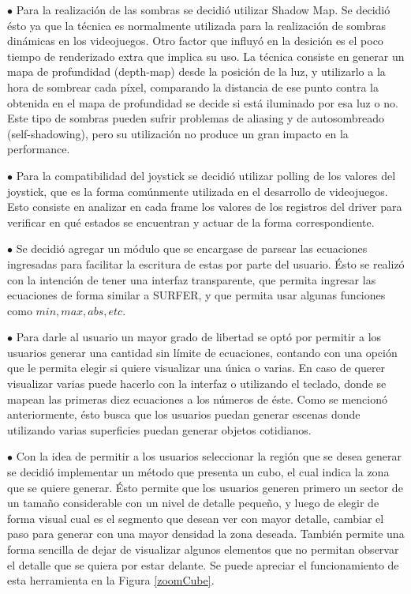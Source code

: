 \documentclass[12pt]{article}
\begin{document}
$\bullet$ Para la realización de las sombras se decidió utilizar Shadow Map\cite{shadowmap}\cite{realtimerendering}. Se decidió ésto ya que la técnica es normalmente utilizada para la realización de sombras dinámicas en los videojuegos\cite{engine}\cite{realtimerendering}. Otro factor que influyó en la desición es el poco tiempo de renderizado extra que implica su uso. La técnica consiste en generar un mapa de profundidad (depth-map) desde la posición de la luz, y utilizarlo a la hora de sombrear cada píxel, comparando la distancia de ese punto contra la obtenida en el mapa de profundidad se decide si está iluminado por esa luz o no. Este tipo de sombras pueden sufrir problemas de aliasing y de autosombreado (self-shadowing)\cite{realtimerendering}, pero su utilización no produce un gran impacto en la performance.

$\bullet$ Para la compatibilidad del joystick se decidió utilizar polling de los valores del joystick, que es la forma comúnmente utilizada en el desarrollo de videojuegos\cite{engine}. Esto consiste en analizar en cada frame los valores de los registros del driver para verificar en qué estados se encuentran y actuar de la forma correspondiente.

$\bullet$ Se decidió agregar un módulo que se encargase de parsear las ecuaciones ingresadas para facilitar la escritura de estas por parte del usuario. Ésto se realizó con la intención de tener una interfaz transparente, que permita ingresar las ecuaciones de forma similar a SURFER, y que permita usar algunas funciones como $min, max, abs, etc$.

$\bullet$ Para darle al usuario un mayor grado de libertad se optó por permitir a los usuarios generar una cantidad sin límite de ecuaciones, contando con una opción que le permita elegir si quiere visualizar una única o varias. En caso de querer visualizar varias puede hacerlo con la interfaz o utilizando el teclado, donde se mapean las primeras diez ecuaciones a los números de éste. Como se mencionó anteriormente, ésto busca que los usuarios puedan generar escenas donde utilizando varias superficies puedan generar objetos cotidianos.

$\bullet$ Con la idea de permitir a los usuarios seleccionar la región que se desea generar se decidió implementar un método que presenta un cubo, el cual indica la zona que se quiere generar. Ésto permite que los usuarios generen primero un sector de un tamaño considerable con un nivel de detalle pequeño, y luego de elegir de forma visual cual es el segmento que desean ver con mayor detalle, cambiar el paso para generar con una mayor densidad la zona deseada. También permite una forma sencilla de dejar de visualizar algunos elementos que no permitan observar el detalle que se quiera por estar delante. Se puede apreciar el funcionamiento de esta herramienta en la Figura \ref{zoomCube}.
\end{document}

